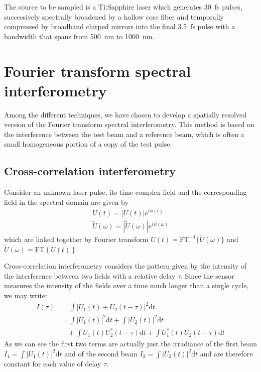 \documentclass[12pt,a4paper,twoside]{article}
\begin{document}
The source to be sampled is a Ti:Sapphire laser which generates \SI{30}{\fs} pulses, successively spectrally broadened by a hollow core fiber and temporally compressed by broadband chirped mirrors into the final \SI{3.5}{\fs} pulse with a bandwidth that spans from \SI{500}{\nm} to \SI{1000}{\nm}.

\clearpage
\section{Fourier transform spectral interferometry}
Among the different techniques, we have chosen to develop a spatially resolved version of the Fourier transform spectral interferometry.
This method is based on the interference between the test beam and a reference beam, which is often a small homogeneous portion of a copy of the test pulse.

\subsection{Cross-correlation interferometry}
Consider an unknown laser pulse, its time complex field and the corresponding field in the spectral domain are given by
\begin{gather}
	U(t) = |U(t)|e^{i\phi(t)} \\
	\tilde{U}(\omega) = |\tilde{U}(\omega)|e^{i\psi(\omega)}
	\label{eq_def}
\end{gather}
which are linked together by Fourier transform $U(t) = \mathrm{FT}^{-1} \lbrace \tilde{U}(\omega) \rbrace$ and $\tilde{U}(\omega) = \mathrm{FT} \left\lbrace U(t) \right\rbrace$

Cross-correlation interferometry considers the pattern given by the intensity of the interference between two fields with a relative delay $\tau$.
Since the sensor measures the intensity of the fields over a time much longer than a single cycle, we may write:
\begin{align}
	I(\tau) 	&= \int|U_1(t)+U_2(t-\tau)|^2\mathrm{d}t \nonumber\\
			&= \int|U_1(t)|^2\mathrm{d}t + \int|U_2(t)|^2\mathrm{d}t \nonumber\\
			&\quad + \int U_1(t)U_2^*(t-\tau)\mathrm{d}t + \int U_1^*(t)U_2(t-\tau)\mathrm{d}t 
	\label{eq_xcorr}
\end{align}
As we can see the first two terms are actually just the irradiance of the first beam $I_1 = \int|U_1(t)|^2\mathrm{d}t$ and of the second beam $I_2 = \int|U_2(t)|^2\mathrm{d}t$ and are therefore constant for each value of delay $\tau$.
\end{document}
